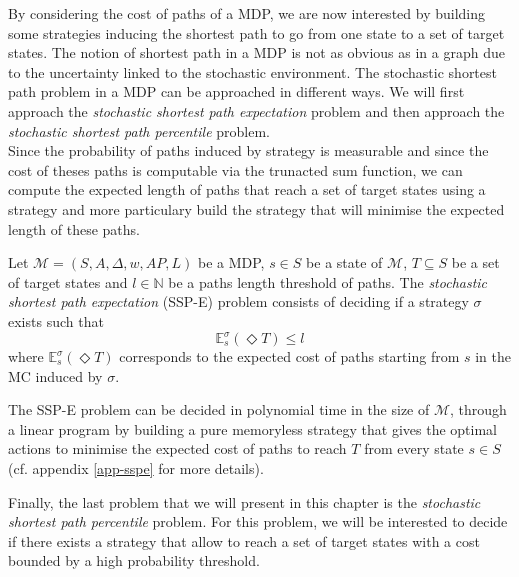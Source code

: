 By considering the cost of paths of a MDP, we are now interested by building some
strategies inducing the shortest path to go from one state to a set of target
states. The notion of shortest path in a MDP is not as obvious as in a graph due to the uncertainty linked to the stochastic environment.
The stochastic shortest path problem in a MDP can be approached in different
ways. We will first approach the \textit{stochastic shortest path expectation} problem and
then approach the \textit{stochastic shortest path percentile} problem. \\

Since the probability of paths induced by strategy is measurable and
since the cost of theses paths is computable via the trunacted sum function, we can
compute the expected length of paths that reach a set of target states using a strategy and more particulary build the strategy that will minimise the expected length of these paths.

\begin{definition}
Let $\mathcal{M}=(S, A, \Delta, w, AP, L)$ be a MDP, $s \in S$ be a state of $\mathcal{M}$,
$T \subseteq S$ be a set of target states and $l \in \mathbb{N}$ be a paths length
threshold of paths. The \textit{stochastic shortest path expectation} (SSP-E) problem
consists of deciding if a strategy $\sigma$ exists such that
\[
  \mathbb{E}^\sigma_s(\Diamond T) \leq l
\]
where $\mathbb{E}_s^\sigma(\Diamond T)$ corresponds to the expected cost of paths starting from $s$ in the MC induced by $\sigma$.
\end{definition}

\begin{theorem}
  The SSP-E problem can be decided in polynomial time in the size of $\mathcal{M}$, through a linear program by building a pure memoryless strategy that gives the optimal actions to minimise the expected cost of paths to reach $T$ from every state $s \in S$ (cf. appendix \ref{app-sspe} for more details).
\end{theorem}

Finally, the last problem that we will present in this chapter is the
\textit{stochastic shortest path percentile} problem. For this problem, we will
be interested to decide if there exists a strategy that allow to reach a set of target states with
a cost bounded by a high probability threshold.

